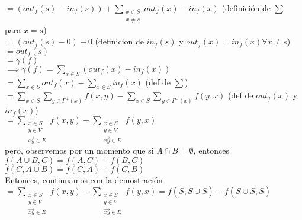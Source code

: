 \documentclass[12pt]{article}
\begin{document}
\(= (out_f(s) - in_f(s)) + \sum_{\substack{x \in S \\ x \ne s}}out_f(x) - in_f(x)\) \hspace{12em}(definición de $\sum$ para $x=s$)\\ 

\(= (out_f(s) - 0) + 0\) \hspace{16em}(definicion de $in_f(s)$ y $out_f(x) = in_f(x) \forall x \ne s $)\\

\(= out_f(s)\) \\

\(= \gamma(f)\) \\

\(\implies \gamma(f) = \sum_{x \in S}(out_f(x)-in_f(x))\) \\

\(= \sum_{x \in S}out_f(x) - \sum_{x \in S}in_f(x)\) \hspace{26em} (def de $\sum$) \\

\(= \sum_{x \in S}\sum_{y \in \Gamma^{+}(x)}f(x, y) - \sum_{x \in S}\sum_{y \in \Gamma^{-}(x)}f(y,x)\) \hspace{12em} (def de $out_f(x)$ y $in_f(x)$)\\

\(= \sum_{\substack{x \in S \\ y \in V \\ \overrightarrow{xy} \in E}}f(x,y) - \sum_{\substack{x \in S \\ y \in V \\ \overrightarrow{xy} \in E}}f(y,x)\)\\

pero, observemos por un momento que si $A\cap B = \emptyset$, entonces\\

\(f(A \cup B, C) = f(A,C) + f(B, C)\)\\

\(f(C, A \cup B) = f(C, A) + f(C, B)\)\\

Entonces, continuamos con la demostración\\

\(= \sum_{\substack{x \in S \\ y \in V \\ \overrightarrow{xy} \in E}}f(x,y) - \sum_{\substack{x \in S \\ y \in V \\ \overrightarrow{xy} \in E}}f(y,x) = f(S, S \cup \overline{S}) - f(S \cup \overline{S}, S)\) \\
\end{document}
